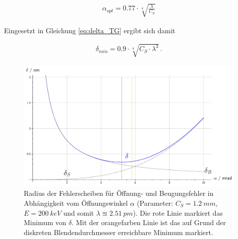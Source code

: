 \documentclass[
	paper=a4,				%
	twoside=true,			%
	BCOR=6mm,				%
	fontsize=12pt,			%
	pagesize=auto,			%
	numbers=noenddot,		%
	bibliography=totoc,		%
	draft=false
]{scrartcl}
\begin{document}
\begin{align}
\alpha_{opt} = \num{0,77} \cdot \sqrt[4]{\frac{\lambda}{C_S}} \label{eq:alpha_opt}
\end{align}

Eingesetzt in Gleichung \ref{eq:delta_TG} ergibt sich damit

\begin{align}
\delta_{min} = \num{0,9} \cdot \sqrt[4]{C_S\cdot \lambda^3}\,. \label{eq:delta_min}
\end{align}

\begin{figure}
	\centering
	\includegraphics[width=1\linewidth]{../../Jupyter-Notebooks/AnhangC/Bilder/delta_TG}
	\caption{Radius der Fehlerscheiben für Öffnung- und Beugungsfehler in Abhängigkeit vom Öffnungswinkel $\alpha$ (Parameter: $C_S = \SI{1,2}{mm}$, $E=\SI{200}{keV}$ und somit $\lambda\approxeq \SI{2,51}{pm}$). Die rote Linie markiert das Minimum von $\delta$. Mit der orangefarben Linie ist das auf Grund der diskreten Blendendurchmesser erreichbare Minimum markiert.}
	\label{fig:delta_TG}
\end{figure}
\end{document}

